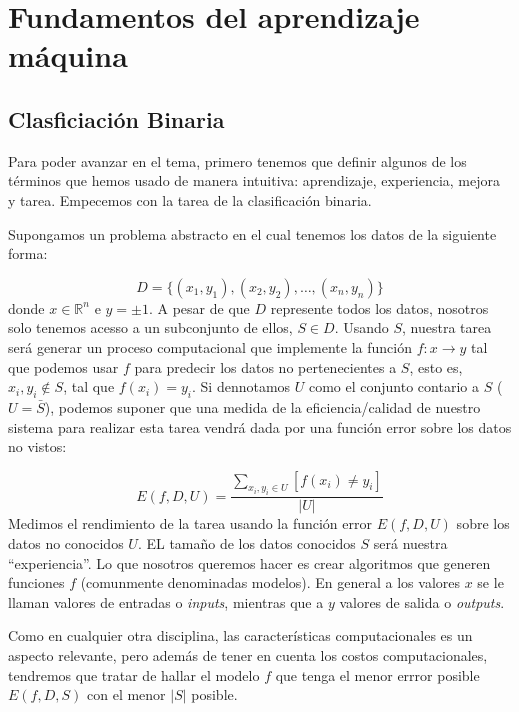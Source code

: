 \chapter{Fundamentos del aprendizaje máquina}

\section{Clasficiación Binaria}

Para poder avanzar en el tema, primero tenemos que definir algunos de los términos que hemos usado de manera intuitiva: aprendizaje, experiencia, mejora y tarea. Empecemos con la tarea de la clasificación binaria. 

Supongamos un problema abstracto en el cual tenemos los datos de la siguiente forma: 

\begin{equation}
    D = \{ (x_1,y_1),(x_2,y_2),\ldots, (x_n,y_n) \}
\end{equation}
donde $x\in \mathbb{R}^n$ e $y=\pm 1$. A pesar de que $D$ represente todos los datos, nosotros solo tenemos acesso a un subconjunto de ellos, $S\in D$. Usando $S$, nuestra tarea será generar un proceso computacional que implemente la función $f:x\to y$  tal que podemos usar $f$ para predecir los datos no pertenecientes a $S$, esto es,  $x_i, y_i\notin S$, tal que $f(x_i)=y_i$. Si dennotamos  $U$ como el conjunto contario a $S$ ($U=\bar{S}$), podemos suponer que una medida de la eficiencia/calidad de nuestro sistema para realizar esta tarea vendrá dada por una función error sobre los datos no vistos: 

\begin{equation}
    E(f,D,U) = \frac{\sum_{x_i,y_i \in U} [f(x_i)\neq y_i] }{|U|}
\end{equation} 
Medimos el rendimiento de la tarea usando la función error $E(f,D,U)$ sobre los datos no conocidos $U$. EL tamaño de los datos conocidos $S$ será nuestra ``experiencia''. Lo que nosotros queremos hacer es crear algoritmos que generen funciones $f$ (comunmente denominadas modelos).  En general a los valores $x$ se le llaman valores de entradas o \textit{inputs}, mientras que a $y$ valores de salida o \textit{outputs}.

Como en cualquier otra disciplina, las características computacionales es un aspecto relevante, pero además de tener en cuenta los costos computacionales, tendremos que tratar de hallar el modelo $f$ que tenga el menor errror posible $E(f,D,S)$ con el menor $|S|$ posible. 

